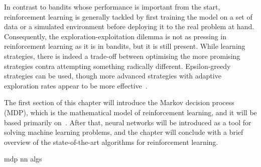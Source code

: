 In contrast to bandits whose performance is important from the start, reinforcement learning is generally tackled by first training the model on a set of data or a simulated environment before deploying it to the real problem at hand.
Consequently, the exploration-exploitation dilemma is not as pressing in reinforcement learning as it is in bandits, but it is still present.
While learning strategies, there is indeed a trade-off between optimising the more promising strategies contra attempting something radically different.
Epsilon-greedy strategies can be used, though more advanced strategies with adaptive exploration rates appear to be more effective~\autocite{tokic2011}.

The first section of this chapter will introduce the Markov decision process (MDP), which is the mathematical model of reinforcement learning, and it will be based primarily on~\autocite{lattimore2020,sutton2018}.
After that, neural networks will be introduced as a tool for solving machine learning problems, and the chapter will conclude with a brief overview of the state-of-the-art algorithms for reinforcement learning.


{mdp}
{nn}
{algs}